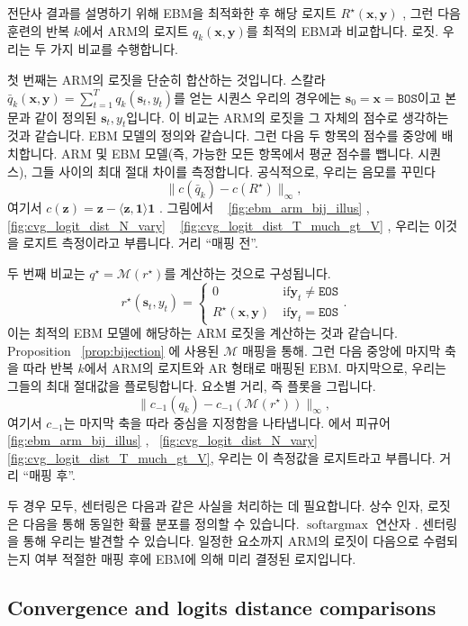 \documentclass{article}
\def\s{{\bm{s}}}
\def\x{{\bm{x}}}
\def\y{{\bm{y}}}
\def\z{{\bm{z}}}
\def\cM{{\mathcal{M}}}
\def\softargmax{{\operatorname{softargmax}}}
\def\ones{{\mathbf{1}}}
\def\bos{\texttt{BOS}\xspace}
\def\eos{\texttt{EOS}\xspace}
\begin{document}
전단사 결과를 설명하기 위해 EBM을 최적화한 후
해당 로지트 $R^\star(\x, \y)$ , 그런 다음 훈련의 반복 $k$에서 ARM의 로지트 $q_k(\x,
\y)$를 최적의 EBM과 비교합니다.
로짓. 우리는 두 가지 비교를 수행합니다.

첫 번째는 ARM의 로짓을 단순히 합산하는 것입니다.
스칼라 $\bar q_k(\x, \y) = \sum_{t=1}^T q_k(\s_t, y_t)$를 얻는 시퀀스
 우리의 경우에는 $\s_0 = \x = \bos$이고 본문과 같이 정의된 $\s_t, y_t$입니다.
이 비교는 ARM의 로짓을 그 자체의 점수로 생각하는 것과 같습니다.
EBM 모델의 정의와 같습니다.  그런 다음 두 항목의 점수를 중앙에 배치합니다.
ARM 및 EBM 모델(즉, 가능한 모든 항목에서 평균 점수를 뺍니다.
시퀀스), 그들 사이의 최대 절대 차이를 측정합니다. 공식적으로,
우리는 음모를 꾸민다 
\[
\|c( \bar q_k) - c(R^ \star )\|_ \infty ,
\]
여기서 $c(\z) = \z - \langle\z, \ones\rangle\ones$ .
그림에서 ~ \ref{fig:ebm_arm_bij_illus} , ~ \ref{fig:cvg_logit_dist_N_vary} 
~ \ref{fig:cvg_logit_dist_T_much_gt_V} , 우리는 이것을 로지트 측정이라고 부릅니다.
거리 ``매핑 전''.

두 번째 비교는 $q^\star = \cM(r^\star)$를 계산하는 것으로 구성됩니다. 
\[
r^ \star ( \s _t, y_t) = \begin{cases} 
    0 & \ \text{if} \y_t \neq \eos \\
    R^ \star ( \x , \y ) & \ \text{if} \y_t = \eos 
 \end{cases} .
\]
이는 최적의 EBM 모델에 해당하는 ARM 로짓을 계산하는 것과 같습니다.
Proposition~ \ref{prop:bijection} 에 사용된 $\cM$ 매핑을 통해.  그런 다음 중앙에
마지막 축을 따라 반복 $k$에서 ARM의 로지트와
AR 형태로 매핑된 EBM. 마지막으로, 우리는 그들의 최대 절대값을 플로팅합니다.
요소별 거리, 즉 플롯을 그립니다. 
\[
\|c_{-1}(q_k) - c_{-1}( \cM (r^ \star ))\|_ \infty ,
\]
여기서 $c_{-1}$는 마지막 축을 따라 중심을 지정함을 나타냅니다.  에서
피규어~ \ref{fig:ebm_arm_bij_illus} ,~ \ref{fig:cvg_logit_dist_N_vary} 
~ \ref{fig:cvg_logit_dist_T_much_gt_V}, 우리는 이 측정값을 로지트라고 부릅니다.
거리 ``매핑 후''.

두 경우 모두, 센터링은 다음과 같은 사실을 처리하는 데 필요합니다.
상수 인자, 로짓은 다음을 통해 동일한 확률 분포를 정의할 수 있습니다.
 $\softargmax$ 연산자 \citep[Remark 4.2]{edpbook} .  센터링을 통해 우리는 발견할 수 있습니다.
일정한 요소까지 ARM의 로짓이 다음으로 수렴되는지 여부
적절한 매핑 후에 EBM에 의해 미리 결정된 로지입니다.

\subsection{Convergence and logits distance comparisons}
\end{document}
